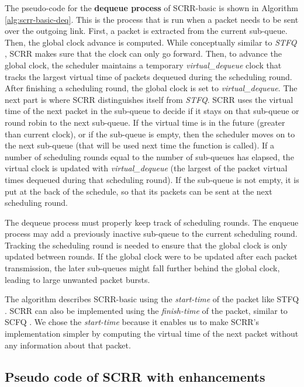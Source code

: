 The pseudo-code for the \textbf{dequeue process} of SCRR-basic is shown in Algorithm \ref{alg:scrr-basic-deq}. This is the process that is run when a packet needs to be sent over the outgoing link. First,
a packet is extracted from the current sub-queue. Then, the global
clock advance is computed. While conceptually similar to \textit{STFQ}
\cite{stfq},  SCRR makes sure that the clock
can only go forward. Then, to advance the global clock, the
scheduler maintains a temporary \textit{virtual\_dequeue} clock that
tracks the largest virtual time of packets dequeued during the
scheduling round. After finishing a scheduling round, the global
clock is set to \textit{virtual\_dequeue}. The next part is where SCRR distinguishes itself from \textit{STFQ}. SCRR uses the virtual time of
the next packet in the sub-queue to decide if it stays on that
sub-queue or round robin to the next sub-queue. If the virtual time is
in the future (greater than current clock), or if the sub-queue is
empty, then the scheduler moves on to the next sub-queue (that will be
used next time the function is called). If a number of scheduling
rounds equal to the number of sub-queues has elapsed, the virtual
clock is updated with \textit{virtual\_dequeue} (the largest of the
packet virtual times dequeued during that scheduling round). If the
sub-queue is not empty, it is put at the back of the schedule, so that
its packets can be sent at the next scheduling round.

The dequeue process must properly keep track of scheduling rounds. The
enqueue process may add a previously inactive sub-queue to the current
scheduling round. Tracking the scheduling round is needed to ensure
that the global clock is only updated between rounds. If the global
clock were to be updated after each packet transmission, the later
sub-queues might fall further behind the global clock, leading to
large unwanted packet bursts.

The algorithm describes SCRR-basic using the \textit{start-time} of
the packet like STFQ \cite{stfq}. SCRR can also be implemented using
the \textit{finish-time} of the packet, similar to SCFQ \cite{scfq}. We
chose the \textit{start-time} because it enables
us to make SCRR's implementation simpler by computing the virtual time
of the next packet without any information about that packet.




\subsection{Pseudo code of SCRR with enhancements}
\label{app:algs-neia}

